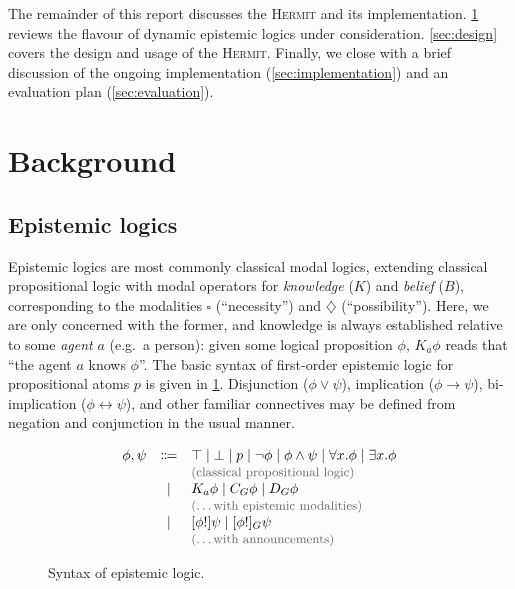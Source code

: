 \documentclass[letterpaper,twocolumn,10pt]{article}
\newcommand{\Hermit}{\textsc{Hermit}\xspace}
\begin{document}
The remainder of this report discusses the \Hermit and its implementation.
\cref{sec:background} reviews the flavour of dynamic epistemic logics under consideration.
\cref{sec:design} covers the design and usage of the \Hermit.
Finally, we close with a brief discussion of the ongoing implementation (\cref{sec:implementation}) and an evaluation plan (\cref{sec:evaluation}).

\section{Background}
\label{sec:background}

\subsection{Epistemic logics}
\label{sec:background-el}

Epistemic logics are most commonly classical modal logics, extending classical propositional logic with modal operators for \emph{knowledge} (\(K\)) and \emph{belief} (\(B\)), corresponding to the modalities \(\square\) (``necessity'') and \(\diamondsuit\) (``possibility'').
Here, we are only concerned with the former, and knowledge is always established relative to some \emph{agent} \(a\) (e.g.\ a person):
given some logical proposition \(\phi\), \(K_a \phi\) reads that ``the agent \(a\) knows \(\phi\)''.
The basic syntax of first-order epistemic logic for propositional atoms \(p\) is given in \cref{fig:background-el}.
Disjunction (\(\phi \lor \psi\)), implication (\(\phi \to \psi\)), bi-implication (\(\phi \leftrightarrow \psi\)), and other familiar connectives may be defined from negation and conjunction in the usual manner.

\newcommand{\syntaxLabel}[1]{\ensuremath{\text{\small\color{black!60} (#1)}}}
\begin{figure}[ht]
  \centering
  \[\begin{array}{rcll}
    \phi, \psi & \Coloneqq &
      \top \mid
      \bot \mid
      p \mid
      \lnot \phi \mid
      \phi \land \psi \mid
      \forall x. \phi \mid
      \exists x. \phi \\
    &   & \syntaxLabel{classical propositional logic} \\
    & \mid &
      K_a \phi \mid
      C_G \phi \mid
      D_G \phi \\
    &   & \syntaxLabel{\ldots with epistemic modalities} \\
    & \mid &
      [\phi!] \psi \mid
      [\phi!]_G \psi
      \\
    &   & \syntaxLabel{\ldots with announcements} \\
  \end{array}\]
  \caption{Syntax of epistemic logic.}
  \label{fig:background-el}
\end{figure}
\end{document}
